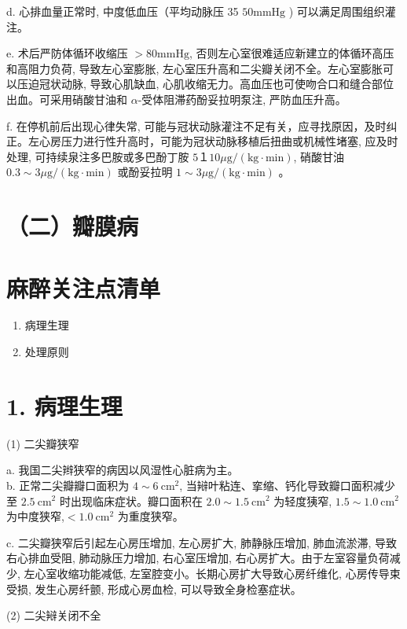 \documentclass[10pt]{article}
\begin{document}
d. 心排血量正常时, 中度低血压（平均动脉压 35 $50 \mathrm{mmHg}$ ) 可以满足周围组织灌注。

e. 术后严防体循环收缩压 $>80 \mathrm{mmHg}$, 否则左心室很难适应新建立的体循环高压和高阻力负荷, 导致左心室膨胀, 左心室压升高和二尖瓣关闭不全。左心室膨胀可以压迫冠状动脉, 导致心肌缺血, 心肌收缩无力。高血压也可使吻合口和缝合部位出血。可采用硝酸甘油和 $\alpha$-受体阻滞药酚妥拉明泵注, 严防血压升高。

f. 在停机前后出现心律失常, 可能与冠状动脉灌注不足有关，应寻找原因，及时纠正。左心房压力进行性升高时，可能为冠状动脉移植后扭曲或机械性堵塞, 应及时处理, 可持续泉注多巴胺或多巴酚丁胺 $5 １ 10 \mu \mathrm{g} /(\mathrm{kg} \cdot \mathrm{min})$, 硝酸甘油 $0.3 \sim 3 \mu \mathrm{g} /(\mathrm{kg} \cdot \mathrm{min})$ 或酚妥拉明 $1 \sim 3 \mu \mathrm{g} /(\mathrm{kg} \cdot \mathrm{min})$ 。

\section*{（二）瓣膜病}
\section*{麻醉关注点清单}
\begin{enumerate}
  \item 病理生理

  \item 处理原则

\end{enumerate}

\section*{1. 病理生理}
(1) 二尖瓣狭窄

a. 我国二尖辫狭窄的病因以风湿性心脏病为主。\\
b. 正常二尖瓣瓣口面积为 $4 \sim 6 \mathrm{~cm}^{2}$, 当㦚叶粘连、挛缩、钙化导致瓣口面积减少至 $2.5 \mathrm{~cm}^{2}$ 时出现临床症状。瓣口面积在 $2.0 \sim 1.5 \mathrm{~cm}^{2}$ 为轻度㹫窄, $1.5 \sim 1.0 \mathrm{~cm}^{2}$ 为中度狭窄,$<1.0 \mathrm{~cm}^{2}$ 为重度狭窄。

c. 二尖瓣狭窄后引起左心房压增加, 左心房扩大, 肺静脉压增加, 肺血流淤滞, 导致右心排血受阻, 肺动脉压力增加, 右心室压增加, 右心房扩大。由于左室容量负荷减少, 左心室收缩功能减低, 左室腔变小。长期心房扩大导致心房纤维化, 心房传导束受损, 发生心房纤颤, 形成心房血检, 可以导致全身检塞症状。

(2) 二尖㦚关闭不全
\end{document}
